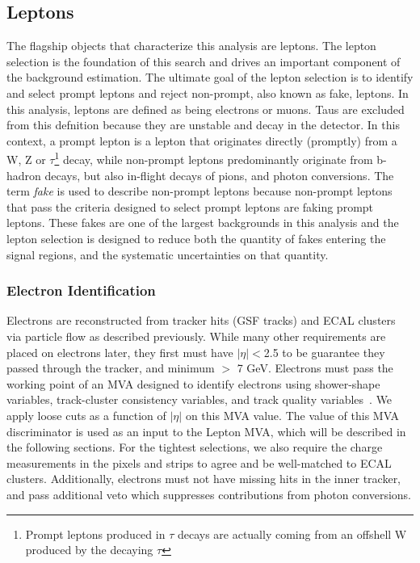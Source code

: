 \subsection{Leptons}
The flagship objects that characterize this analysis are leptons. The lepton selection is the foundation of this \tth search and drives an important component of the background estimation.
The ultimate goal of the lepton selection is to identify and select prompt leptons and reject non-prompt, also known as fake, leptons. In this analysis, leptons are defined as being electrons or muons.
Taus are excluded from this defnition because they are unstable and decay in the detector. In this context, a prompt lepton
is a lepton that originates directly (promptly) from a W, Z or $\tau$\footnote{Prompt leptons produced in $\tau$ decays are actually coming from an offshell W produced by the decaying $\tau$} decay, while non-prompt leptons
predominantly originate from b-hadron decays, but also in-flight decays of pions, and photon conversions. The term \emph{fake} is used to describe non-prompt leptons because non-prompt leptons
that pass the criteria designed to select prompt leptons are faking prompt leptons. These fakes are one of the largest backgrounds in this analysis and the lepton selection is designed to reduce both
the quantity of fakes entering the signal regions, and the systematic uncertainties on that quantity. 

\subsubsection{Electron Identification}
Electrons are reconstructed from tracker hits (GSF tracks) and ECAL clusters via particle flow as described previously. While many other requirements are placed on electrons later, they first must
have $|\eta|<$2.5 to be guarantee they passed through the tracker, and minimum \pt $>$ 7 GeV. Electrons must pass the working point of an MVA designed to identify electrons using shower-shape variables,
track-cluster consistency variables, and track quality variables~\cite{elemvaid}. We apply loose cuts as a function of $|\eta|$ on this MVA value. The value of this MVA discriminator is used as an input to
the Lepton MVA, which will be described in the following sections. For the tightest selections, we also require the charge measurements in the pixels and strips to agree and be well-matched to ECAL clusters.
Additionally, electrons must not have missing hits in the inner tracker, and pass additional veto which suppresses contributions from photon conversions. 


